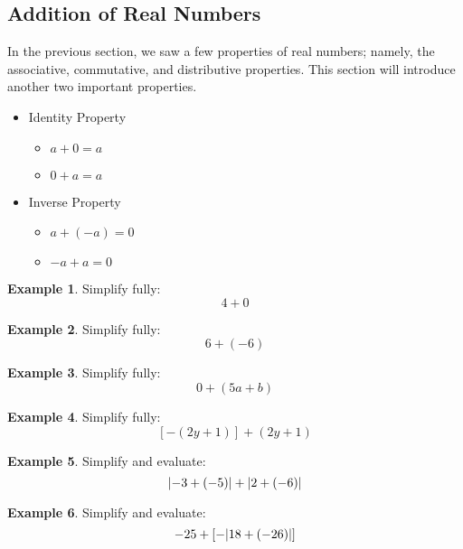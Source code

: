 \documentclass[addpoints,12pt]{exam}
\theoremstyle{definition}
\newtheorem{example}{Example}[subsection]
\begin{document}
\setcounter{section}{1}
\setcounter{subsection}{4}

\subsection{Addition of Real Numbers}

\noindent In the previous section, we saw a few properties of real numbers; namely, the associative, commutative, and distributive properties. This section will introduce another two important properties.

\vspace{.1in}

\begin{itemize}
\item Identity Property
\begin{itemize}
\item $a + 0 = a$
\item $0 + a = a$
\end{itemize}
\item Inverse Property
\begin{itemize}
\item $a + (-a) = 0$
\item $-a + a = 0$
\end{itemize}
\end{itemize}

\vspace{.1in}

\begin{example}
Simplify fully: \[4 + 0\]
\vspace{.25in}
\end{example}

\begin{example}
Simplify fully: \[6 + (-6)\]
\vspace{.25in}
\end{example}

\begin{example}
Simplify fully: \[0 + (5a + b)\]
\vspace{.25in}
\end{example}

\begin{example}
Simplify fully: \[[-(2y+1)] + (2y+1)\]
\vspace{.25in}
\end{example}

\newpage

\begin{example}
Simplify and evaluate: \[\abs{-3 + (-5)} + \abs{2 + (-6)}\]
\vspace{2in}
\end{example}

\begin{example}
Simplify and evaluate: \[-25 + [-\abs{18 + (-26)}]\]
\end{example}
\end{document}
